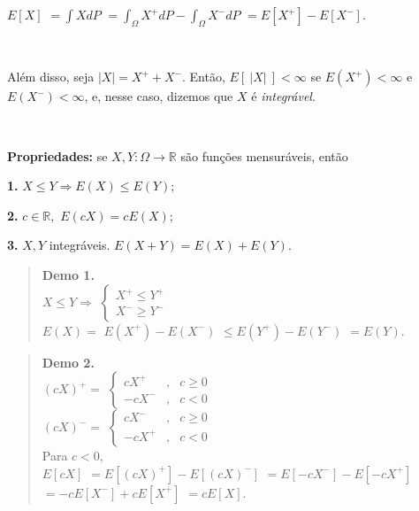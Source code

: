 \documentclass[
]{book}
\begin{document}
\(E[X]\) \(=\displaystyle\int X dP\) \(=\displaystyle\int_\Omega X^+dP - \int_\Omega X^- dP\) \(=E\left[X^+\right] - E\left[X^-\right]\).

\(~\)

Além disso, seja \(|X| = X^+ + X^-\). Então, \(E\left[~|X|~\right] < \infty\) se \(E(X^+) < \infty\) e \(E(X^-) < \infty\), e, nesse caso, dizemos que \(X\) é \emph{integrável}.

\(~\)

\textbf{Propriedades:} se \(X, Y: \Omega \longrightarrow \mathbb{R}\) são funções mensuráveis, então

\textbf{1.} \(X \leq Y \Rightarrow E(X) \leq E(Y)\);

\textbf{2.} \(c \in \mathbb{R},\) \(E(cX) = cE(X)\);

\textbf{3.} \(X,Y\) integráveis. \(E(X+Y) = E(X) + E(Y)\).

\begin{quote}
\textbf{Demo 1.}\\
\(X \leq Y \Rightarrow\) \(\left\{\begin{array}{c}X^+ \leq Y^+\\ X^- \geq Y^-\end{array}\right.\)\\
\(E(X) =\) \(E(X^+) - E(X^-)\) \(\leq E(Y^+) - E(Y^-)\) \(=E(Y).\)
\end{quote}

\begin{quote}
\textbf{Demo 2.}\\
\((cX)^+ =\) \(\left\{\begin{array}{rcl}cX^+ &,& c \geq 0\\ -cX^- &,& c < 0 \end{array}\right.\)\\
\((cX)^- =\) \(\left\{\begin{array}{rcl}cX^- &,& c \geq 0\\ -cX^+ &,& c < 0 \end{array}\right.\)\\
Para \(c<0\),\\
\(E[cX]\) \(= E[(cX)^+] - E[(cX)^-]\) \(= E[-cX^-] - E[-cX^+]\) \(= -cE[X^-] + cE[X^+]\) \(= cE[X]\).
\end{quote}
\end{document}
